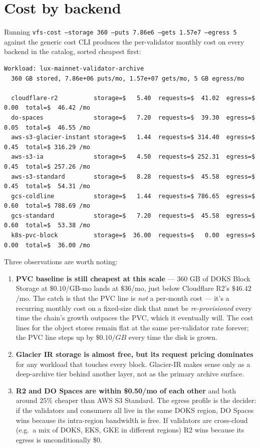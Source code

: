 \documentclass[11pt,a4paper]{article}
\begin{document}
\section{Cost by backend}
\label{sec:catalog}

Running \texttt{vfs-cost --storage 360 --puts 7.86e6 --gets 1.57e7 --egress 5}
against the generic cost CLI produces the per-validator monthly cost
on every backend in the catalog, sorted cheapest first:

\begin{lstlisting}
Workload: lux-mainnet-validator-archive
  360 GB stored, 7.86e+06 puts/mo, 1.57e+07 gets/mo, 5 GB egress/mo

  cloudflare-r2          storage=$   5.40  requests=$  41.02  egress=$   0.00  total=$  46.42 /mo
  do-spaces              storage=$   7.20  requests=$  39.30  egress=$   0.05  total=$  46.55 /mo
  aws-s3-glacier-instant storage=$   1.44  requests=$ 314.40  egress=$   0.45  total=$ 316.29 /mo
  aws-s3-ia              storage=$   4.50  requests=$ 252.31  egress=$   0.45  total=$ 257.26 /mo
  aws-s3-standard        storage=$   8.28  requests=$  45.58  egress=$   0.45  total=$  54.31 /mo
  gcs-coldline           storage=$   1.44  requests=$ 786.65  egress=$   0.60  total=$ 788.69 /mo
  gcs-standard           storage=$   7.20  requests=$  45.58  egress=$   0.60  total=$  53.38 /mo
  k8s-pvc-block          storage=$  36.00  requests=$   0.00  egress=$   0.00  total=$  36.00 /mo
\end{lstlisting}

\noindent
Three observations are worth noting:

\begin{enumerate}[noitemsep]
  \item \textbf{PVC baseline is still cheapest at this scale} --- 360
    GB of DOKS Block Storage at $\$0.10$/GB-mo lands at $\$36$/mo,
    just below Cloudflare R2's $\$46.42$/mo. The catch is that the
    PVC line is \emph{not} a per-month cost --- it's a recurring monthly
    cost on a fixed-size disk that must be \emph{re-provisioned} every
    time the chain's growth outpaces the PVC, which it eventually
    will. The cost lines for the object stores remain flat at the
    same per-validator rate forever; the PVC line steps up by
    $\$0.10/GB$ every time the disk is grown.
  \item \textbf{Glacier IR storage is almost free, but its request
    pricing dominates} for any workload that touches every block.
    Glacier-IR makes sense only as a deep-archive tier behind another
    layer, not as the primary archive surface.
  \item \textbf{R2 and DO Spaces are within \$0.50/mo of each other}
    and both around $25\%$ cheaper than AWS S3 Standard. The egress
    profile is the decider: if the validators and consumers all live
    in the same DOKS region, DO Spaces wins because its intra-region
    bandwidth is free. If validators are cross-cloud (e.g.\ a mix of
    DOKS, EKS, GKE in different regions) R2 wins because its egress
    is unconditionally \$0.
\end{enumerate}
\end{document}
